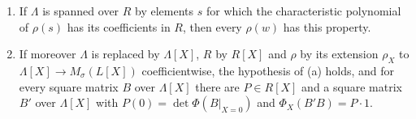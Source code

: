 \begin{lemma}\label{lem:amitsur}
\begin{enumerate}[label=\textup{(\alph*)}]
\item If $\Lambda$ is spanned over $R$ by elements $s$ for which the characteristic polynomial of $\rho(s)$ has its coefficients in $R$, then every $\rho(w)$ has this property.
\item If moreover $\Lambda$ is replaced by $\Lambda[X]$, $R$ by $R[X]$ and $\rho$ by its extension $\rho_X$ to $\Lambda[X]\to M_\sigma(L[X])$ coefficientwise, the hypothesis of (a) holds, and for every square matrix $B$ over $\Lambda[X]$ there are $P\in R[X]$
and a square matrix $B'$ over $\Lambda[X]$ with $P(0)=\det\Phi(B|_{X=0})$ and $\Phi_X(B'B)=P\cdot1$.
\end{enumerate}
\end{lemma}


